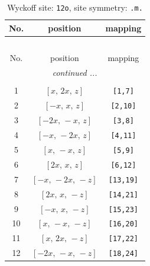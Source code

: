 \documentclass[fleqn,8pt]{jsarticle}
\begin{document}
\begin{longtable}{ccc}
\caption{Wyckoff site: {\tt 12o}, site symmetry: {\tt .m.}}
 \\
 \hline \hline
No. & position & mapping \\ \hline \endfirsthead

\multicolumn{2}{l}{\tablename\ \thetable{}} \\
 \hline \hline
No. & position & mapping \\ \hline \endhead

 \hline \hline
\multicolumn{2}{r}{\footnotesize\it continued ...} \\ \endfoot

 \hline \hline
\multicolumn{2}{r}{} \\ \endlastfoot

1 & $\left[ x,\, 2 x,\, z \right]$ & {\tt [1,7]} \\ \hline
2 & $\left[ - x,\, x,\, z \right]$ & {\tt [2,10]} \\ \hline
3 & $\left[ - 2 x,\, - x,\, z \right]$ & {\tt [3,8]} \\ \hline
4 & $\left[ - x,\, - 2 x,\, z \right]$ & {\tt [4,11]} \\ \hline
5 & $\left[ x,\, - x,\, z \right]$ & {\tt [5,9]} \\ \hline
6 & $\left[ 2 x,\, x,\, z \right]$ & {\tt [6,12]} \\ \hline
7 & $\left[ - x,\, - 2 x,\, - z \right]$ & {\tt [13,19]} \\ \hline
8 & $\left[ 2 x,\, x,\, - z \right]$ & {\tt [14,21]} \\ \hline
9 & $\left[ - x,\, x,\, - z \right]$ & {\tt [15,23]} \\ \hline
10 & $\left[ x,\, - x,\, - z \right]$ & {\tt [16,20]} \\ \hline
11 & $\left[ x,\, 2 x,\, - z \right]$ & {\tt [17,22]} \\ \hline
12 & $\left[ - 2 x,\, - x,\, - z \right]$ & {\tt [18,24]} \\
\end{longtable}
\renewcommand{\arraystretch}{1.2}
\end{document}
